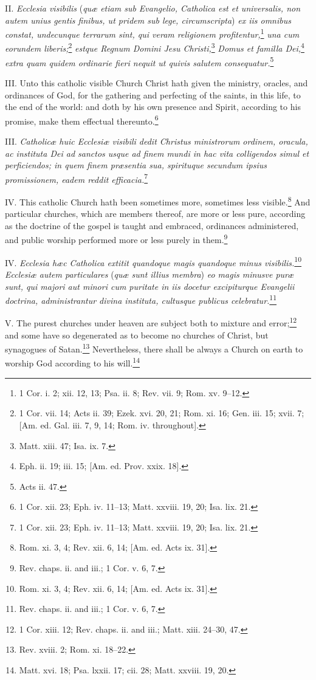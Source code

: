 II.\emph{ Ecclesia visibilis }(\emph{quæ etiam sub Evangelio, Catholica est et universalis, non autem unius gentis finibus, ut pridem sub lege, circumscripta})\emph{ ex iis omnibus constat, undecunque terrarum sint, qui veram religionem profitentur,}\footnote{1 Cor. i. 2; xii. 12, 13; Psa. ii. 8; Rev. vii. 9; Rom. xv. 9–12.}\emph{ una cum eorundem liberis;}\footnote{1 Cor. vii. 14; Acts ii. 39; Ezek. xvi. 20, 21; Rom. xi. 16; Gen. iii. 15; xvii. 7; [Am. ed. Gal. iii. 7, 9, 14; Rom. iv. throughout].}\emph{ estque Regnum Domini Jesu Christi,}\footnote{Matt. xiii. 47; Isa. ix. 7.}\emph{ Domus et familla Dei,}\footnote{Eph. ii. 19; iii. 15; [Am. ed. Prov. xxix. 18].}\emph{ extra quam quidem ordinarie fieri nequit ut quivis salutem consequatur.}\footnote{Acts ii. 47.}

III. Unto this catholic visible Church Christ hath given the ministry, oracles, and ordinances of God, for the gathering and perfecting of the saints, in this life, to the end of the world: and doth by his own presence and Spirit, according to his promise, make them effectual thereunto.\footnote{1 Cor. xii. 23; Eph. iv. 11–13; Matt. xxviii. 19, 20; Isa. lix. 21.}

III. \emph{Catholicæ huic Ecclesiæ visibili dedit Christus ministrorum ordinem, oracula, ac instituta Dei ad sanctos usque ad finem mundi in hac vita colligendos simul et perficiendos; in quem finem præsentia sua, spirituque secundum ipsius promissionem, eadem reddit efficacia.}\footnote{1 Cor. xii. 23; Eph. iv. 11–13; Matt. xxviii. 19, 20; Isa. lix. 21.}

IV. This catholic Church hath been sometimes more, sometimes less visible.\footnote{Rom. xi. 3, 4; Rev. xii. 6, 14; [Am. ed. Acts ix. 31].} And particular churches, which are members thereof, are more or less pure, according as the doctrine of the gospel is taught and embraced, ordinances administered, and public worship performed more or less purely in them.\footnote{Rev. chaps. ii. and iii.; 1 Cor. v. 6, 7.}

IV. \emph{Ecclesia hæc Catholica extitit quandoque magis quandoque minus visibilis.}\footnote{Rom. xi. 3, 4; Rev. xii. 6, 14; [Am. ed. Acts ix. 31].}\emph{ Ecclesiæ autem particulares }(\emph{quæ sunt illius membra})\emph{ eo magis minusve puræ sunt, qui majori aut minori cum puritate in iis docetur excipiturque Evangelii doctrina, administrantur divina instituta, cultusque publicus celebratur.}\footnote{Rev. chaps. ii. and iii.; 1 Cor. v. 6, 7.}

V. The purest churches under heaven are subject both to mixture and error;\footnote{1 Cor. xiii. 12; Rev. chaps. ii. and iii.; Matt. xiii. 24–30, 47.} and some have so degenerated as to become no churches of Christ, but synagogues of Satan.\footnote{Rev. xviii. 2; Rom. xi. 18–22.} Nevertheless, there shall be always a Church on earth to worship God according to his will.\footnote{Matt. xvi. 18; Psa. lxxii. 17; cii. 28; Matt. xxviii. 19, 20.}

